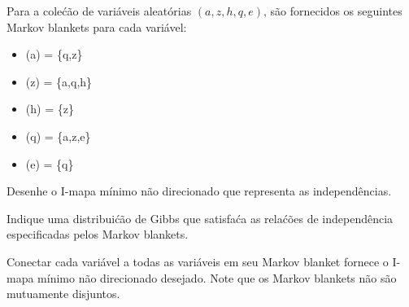 \begin{exenumerate}
    \item Para a cole\'c\~ao de vari\'aveis aleat\'orias $(a,z,h,q,e)$, s\~ao fornecidos os seguintes Markov blankets para cada vari\'avel:
    \begin{itemize}
        \item \MB(a) = \{q,z\}
        \item \MB(z) = \{a,q,h\}
        \item \MB(h) = \{z\}
        \item \MB(q) = \{a,z,e\}
        \item \MB(e) = \{q\}
    \end{itemize}
    \begin{exenumerate}
        \item Desenhe o I-mapa m\'inimo n\~ao direcionado que representa as independ\^encias.
        \item Indique uma distribui\'c\~ao de Gibbs que satisfa\'ca as rela\'c\~oes de independ\^encia especificadas pelos Markov blankets.
    \end{exenumerate}
    
    \begin{solution} Conectar cada vari\'avel a todas as vari\'aveis em seu Markov blanket fornece o I-mapa m\'inimo n\~ao direcionado desejado. Note que os Markov blankets n\~ao s\~ao mutuamente disjuntos. \begin{figure}[h] \begin{center} 
\end{center}
\end{figure}
\end{solution}
\end{exenumerate}
